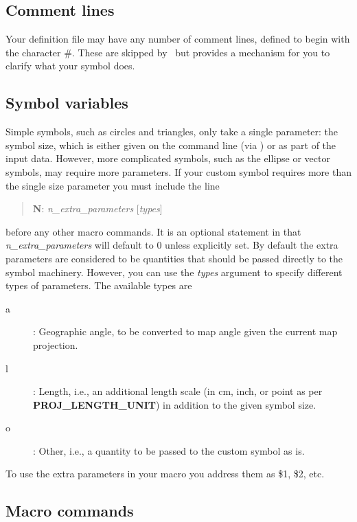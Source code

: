 \subsection{Comment lines}

Your definition file may have any number of comment lines, defined to begin with
the character \#.  These are skipped by \GMT\ but provides a mechanism for you to
clarify what your symbol does.

\subsection{Symbol variables}

Simple symbols, such as circles and triangles, only take a single parameter: the
symbol size, which is either given on the command line (via ) or as part
of the input data.  However, more complicated symbols, such as the ellipse or vector symbols,
may require more parameters.  If your custom symbol requires more than the single size parameter
you must include the line
\begin{quote}
	\textbf{N}: \emph{n\_extra\_parameters} [\emph{types}]
\end{quote}
before any other macro commands.  It is an optional statement in that \emph{n\_extra\_parameters} will
default to 0 unless explicitly set.  By default the extra parameters are considered to be quantities
that should be passed directly to the symbol machinery.  However, you can use the \emph{types} argument
to specify different types of parameters.  The available types are
\begin{description}
	\item [a]: Geographic angle, to be converted to map angle given the current map projection.
	\item [l]: Length, i.e., an additional length scale (in cm, inch, or point as per {\bf PROJ\_LENGTH\_UNIT}) in addition to the given symbol size.
	\item [o]: Other, i.e., a quantity to be passed to the custom symbol as is.
\end{description}
To use the extra parameters in your macro you address them as \$1, \$2, etc.

\subsection{Macro commands}

